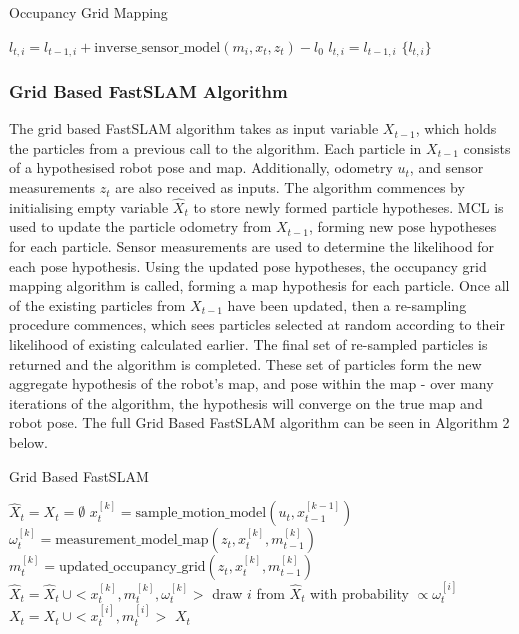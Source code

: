 \documentclass[a4paper]{article}
\begin{document}
\begin{algorithm}[h]
\caption{Occupancy Grid Mapping}
\begin{algorithmic}[1]
		\State $l_{t,i} = l_{t-1,i} + \text{inverse\_sensor\_model}(m_i, x_t, z_t) - l_0$
	\Else
		\State $l_{t,i} = l_{t-1,i}$
	\EndIf
\EndFor
\Return $\{ l_{t,i} \}$
\EndProcedure
\end{algorithmic}
\end{algorithm}

\newpage

\subsubsection{Grid Based FastSLAM Algorithm}
The grid based FastSLAM algorithm takes as input variable $X_{t-1}$, which holds the particles from a previous call to the algorithm. Each particle in $X_{t-1}$ consists of a hypothesised robot pose and map. Additionally, odometry $u_t$, and sensor measurements $z_t$ are also received as inputs. The algorithm commences by initialising empty variable $\hat{X}_t$ to store newly formed particle hypotheses. MCL is used to update the particle odometry from $X_{t-1}$, forming new pose hypotheses for each particle. Sensor measurements are used to determine the likelihood for each pose hypothesis. Using the updated pose hypotheses, the occupancy grid mapping algorithm is called, forming a map hypothesis for each particle. Once all of the existing particles from $X_{t-1}$ have been updated, then a re-sampling procedure commences, which sees particles selected at random according to their likelihood of existing calculated earlier. The final set of re-sampled particles is returned and the algorithm is completed. These set of particles form the new aggregate hypothesis of the robot's map, and pose within the map - over many iterations of the algorithm, the hypothesis will converge on the true map and robot pose. The full Grid Based FastSLAM algorithm can be seen in Algorithm 2 below.

\begin{algorithm}[h]
\caption{Grid Based FastSLAM}
\begin{algorithmic}[1]
\State $\hat{X}_t = X_t = \emptyset$
	\State $x_t^{[k]} = \text{sample\_motion\_model}(u_t, x_{t-1}^{[k-1]})$
	\State $\omega_t^{[k]} = \text{measurement\_model\_map}(z_t, x_t^{[k]}, m_{t-1}^{[k]})$
	\State $m_t^{[k]} = \text{updated\_occupancy\_grid}(z_t, x_t^{[k]}, m_{t-1}^{[k]})$
	\State $\hat{X}_t = \hat{X}_t \ \cup <x_t^{[k]}, m_t^{[k]}, \omega_t^{[k]}>$
\EndFor
{}
	\State draw $i$ from $\hat{X}_t$ with probability $\propto \omega_t^{[i]}$
	\State $X_t = X_t \ \cup <x_t^{[i]}, m_t^{[i]}>$
\EndFor
\Return $X_t$
\EndProcedure
\end{algorithmic}
\end{algorithm}
\end{document}
